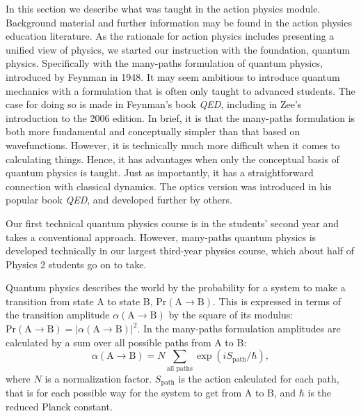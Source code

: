 \documentclass[prb,oncolumn]{revtex4-2}
\begin{document}
In this section we describe what was taught in the action physics module. Background material and further information may be found in the action physics education literature. \cite{TaylorCIP, Hanc2003, Moore, HancAJP2004a, HancAJP2004b, Ogborn, Neuenschwander} As the rationale for action physics includes presenting a unified view of physics, we started our instruction with the foundation, quantum physics. Specifically with the many-paths formulation of quantum physics, introduced by Feynman in 1948. \cite{FeynmanRMP, FeynmanHibbs} It may seem ambitious to introduce quantum mechanics with a formulation that is often only taught to advanced students. The case for doing so is made in Feynman's book \textit{QED}, including in Zee's introduction to the 2006 edition. \cite{QED} In brief, it is that the many-paths formulation is both more fundamental and conceptually simpler than that based on wavefunctions. However, it is technically much more difficult when it comes to calculating things. Hence, it has advantages when only the conceptual basis of quantum physics is taught. Just as importantly, it has a straightforward connection with classical dynamics. \cite{TaylorCIP, Ogborn, Dirac} The optics version was introduced in his popular book \textit{QED},  \cite{QED} and developed further by others. \cite{deGrooth,Field}

Our first technical quantum physics course is in the students' second year and takes a conventional approach. \cite{Griffiths} However, many-paths quantum physics is developed technically in our largest third-year physics course, which about half of Physics 2 students go on to take.

Quantum physics describes the world by the probability for a system to make a transition from state A to state B, $\textrm{Pr} ( \textrm{A} \rightarrow \textrm{B} )$. This is expressed in terms of the transition amplitude $\alpha ( \textrm{A} \rightarrow \textrm{B} )$ by the square of its modulus: $\textrm{Pr} ( \textrm{A} \rightarrow \textrm{B} ) = | \alpha ( \textrm{A} \rightarrow \textrm{B} ) |^2$. In the many-paths formulation amplitudes are calculated by a sum over all possible paths from A to B: 
%
\begin{equation} \label{amplitude}
\alpha ( \textrm{A} \rightarrow \textrm{B} ) = N \sum_\textrm{all paths} \exp ( i S_\textrm{path} / \hbar ) ,
\end{equation}
%
where $N$ is a normalization factor. $S_\textrm{path}$ is the action calculated for each path, that is for each possible way for the system to get from A to B, and $\hbar$ is the reduced Planck constant. 
\end{document}
